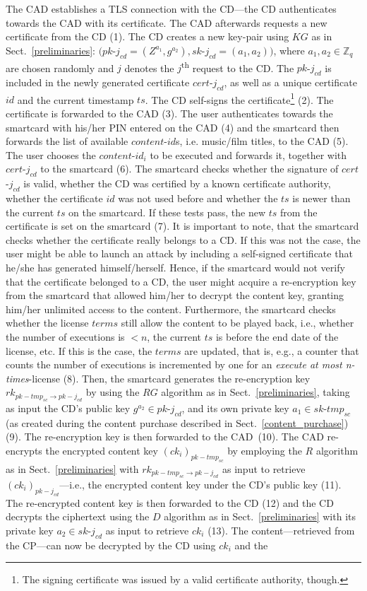 \documentclass{llncs}
\newcommand{\refSec}[1]{Sect.~\ref{#1}}
\begin{document}
The CAD establishes a TLS connection \cite{tls_rfc} with the CD---the CD authenticates towards the CAD with its certificate. The CAD afterwards requests a new certificate from the CD (1). The CD creates a new key-pair using $KG$ as in \refSec{preliminaries}: $(pk$-$j_{cd} = (Z^{a_{1}}, g^{a_{2}}), sk$-$j_{cd} = (a_{1}, a_{2}))$, where $a_{1}, a_{2} \in \mathbb Z_{q}$ are chosen randomly and $j$ denotes the $j$\textsuperscript{th} request to the CD. The $pk$-$j_{cd}$ is included in the newly generated certificate $cert$-$j_{cd}$, as well as a unique certificate $id$ and the current timestamp $ts$. The CD self-signs the certificate\footnote{The signing certificate was issued by a valid certificate authority, though.} (2). The certificate is forwarded to the CAD (3). The user authenticates towards the smartcard with his/her PIN entered on the CAD (4) and the smartcard then forwards the list of available $content$-$id$s, i.e. music/film titles, to the CAD (5). The user chooses the $content$-$id_{i}$ to be executed and forwards it, together with $cert$-$j_{cd}$ to the smartcard (6). The smartcard checks whether the signature of $cert$-$j_{cd}$ is valid, whether the CD was certified by a known certificate authority, whether the certificate $id$ was not used before and whether the $ts$ is newer than the current $ts$ on the smartcard. If these tests pass, the new $ts$ from the certificate is set on the smartcard (7). It is important to note, that the smartcard checks whether the certificate really belongs to a CD. If this was not the case, the user might be able to launch an attack by including a self-signed certificate that he/she has generated himself/herself. Hence, if the smartcard would not verify that the certificate belonged to a CD, the user might acquire a re-encryption key from the smartcard that allowed him/her to decrypt the content key, granting him/her unlimited access to the content. Furthermore, the smartcard checks whether the license $terms$ still allow the content to be played back, i.e., whether the number of executions is $<\!n$, the current $ts$ is before the end date of the license, etc. If this is the case, the $terms$ are updated, that is, e.g., a counter that counts the number of executions is incremented by one for an \emph{execute at most n-times}-license (8). Then, the smartcard generates the re-encryption key $rk_{pk-tmp_{sc} \rightarrow pk-j_{cd}}$ by using the $RG$ algorithm as in \refSec{preliminaries}, taking as input the CD's public key $g^{a_{2}} \in pk$-$j_{cd}$, and its own private key $a_{1} \in sk$-$tmp_{sc}$ (as created during the content purchase described in \refSec{content_purchase}) (9). The re-encryption key is then forwarded to the CAD~(10). The CAD re-encrypts the encrypted content key $(ck_i)_{pk-tmp_{sc}}$ by employing the $R$ algorithm as in \refSec{preliminaries} with $rk_{pk-tmp_{sc} \rightarrow pk-j_{cd}}$ as input to retrieve $(ck_i)_{pk-j_{cd}}$---i.e., the encrypted content key under the CD's public key (11). The re-encrypted content key is then forwarded to the CD (12) and the CD decrypts the ciphertext using the $D$ algorithm as in \refSec{preliminaries} with its private key $a_{2} \in sk$-$j_{cd}$ as input to retrieve $ck_{i}$ (13). The content---retrieved from the CP---can now be decrypted by the CD using $ck_{i}$ and the 
\end{document}
